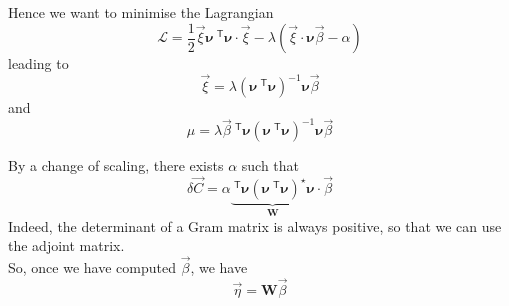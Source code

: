 \documentclass[aps]{revtex4}
\newcommand{\mymat}[1]{\bm{#1}}
\newcommand{\mytrn}[1]{~^{\mathsf{T}}{#1}}
\begin{document}
Hence we want to minimise the Lagrangian
\begin{equation}
	\mathcal{L} = \dfrac{1}{2}\vec{\xi}\mymat{\nu}\mytrn{\mymat{\nu}}\cdot\vec{\xi} 
	- \lambda \left( \vec{\xi} \cdot \mymat{\nu} \vec{\beta} - \alpha\right)
\end{equation}
leading to
\begin{equation}
	\vec{\xi} = \lambda \left(\mymat{\nu}\mytrn{\mymat{\nu}}\right)^{-1} \mymat{\nu} \vec{\beta}
\end{equation}
and
\begin{equation}
	\mu = \lambda \vec{\beta} \mytrn{\mymat{\nu}} \left(\mymat{\nu}\mytrn{\mymat{\nu}}\right)^{-1} \mymat{\nu} \vec{\beta}
\end{equation}

By a change of scaling, there exists $\alpha$ such that
\begin{equation}
	\delta \vec{C} = \alpha \underbrace{\mytrn{\mymat{\nu}} \left(\mymat{\nu}\mytrn{\mymat{\nu}}\right)^{\star} \mymat{\nu}}_{\mymat{W}} \cdot \vec{\beta}
\end{equation}
Indeed, the determinant of a Gram matrix is always positive, so that we can use the  adjoint matrix.\\
So, once we have computed $\vec{\beta}$, we have
\begin{equation}
	\vec{\eta} = \mymat{W} \vec{\beta}
\end{equation}
\end{document}
